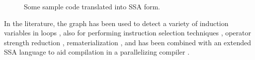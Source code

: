 \begin{figure}[ht]
\centering
{}
\caption{Some sample code translated into SSA form.}
\label{fig: ssa-graph-example-code}
\end{figure}

In the literature, the graph has been used to detect a variety of induction variables in loops \cite{143131,201003}, also for performing instruction selection techniques \cite{1375663,1269857}, operator strength reduction \cite{504710}, rematerialization \cite{143143}, and has been combined with an extended SSA language to aid compilation in a parallelizing compiler \cite{Stoltz_extendedssa}.

